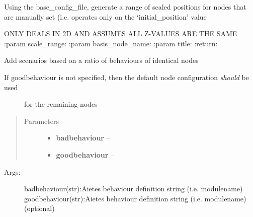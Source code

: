 \documentclass[letterpaper,10pt,english]{sphinxmanual}
\begin{document}
\begin{fulllineitems}
\begin{fulllineitems}
\begin{description}
\end{description}

\end{fulllineitems}


\begin{fulllineitems}
\label{index:polybos.ExperimentManager.add_position_scaling_range}
Using the base\_config\_file, generate a range of scaled positions for nodes that are
manually set (i.e. operates only on the `initial\_position' value

ONLY DEALS IN 2D AND ASSUMES ALL Z-VALUES ARE THE SAME
:param scale\_range:
:param basis\_node\_name:
:param title:
:return:

\end{fulllineitems}


\begin{fulllineitems}
\label{index:polybos.ExperimentManager.add_ratio_scenarios}
Add scenarios based on a ratio of behaviours of identical nodes
\begin{description}
\item[{If goodbehaviour is not specified, then the default node configuration \emph{should} be used}] \leavevmode
for the remaining nodes

\end{description}
\begin{quote}\begin{description}
\item[{Parameters}] \leavevmode\begin{itemize}
\item {} 
\textbf{badbehaviour} -- 

\item {} 
\textbf{goodbehaviour} -- 

\end{itemize}

\end{description}\end{quote}
\begin{description}
\item[{Args:}] \leavevmode
badbehaviour(str):Aietes behaviour definition string (i.e. modulename)
goodbehaviour(str):Aietes behaviour definition string (i.e. modulename) (optional)


\end{description}
\end{fulllineitems}
\end{fulllineitems}
\end{document}
